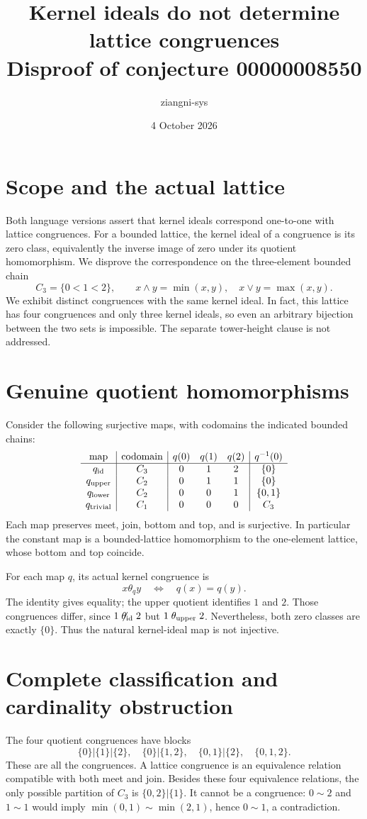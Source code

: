 \documentclass[11pt,a4paper]{article}
\title{Kernel ideals do not determine lattice congruences\\Disproof of conjecture 00000008550}
\author{ziangni-sys}
\date{4 October 2026}
\begin{document}
\maketitle
\section*{Scope and the actual lattice}
Both language versions assert that kernel ideals correspond one-to-one with lattice congruences. For a bounded lattice, the kernel ideal of a congruence is its zero class, equivalently the inverse image of zero under its quotient homomorphism. We disprove the correspondence on the three-element bounded chain
\[
 C_3=\{0<1<2\},\qquad x\wedge y=\min(x,y),\quad x\vee y=\max(x,y).
\]
We exhibit distinct congruences with the same kernel ideal. In fact, this lattice has four congruences and only three kernel ideals, so even an arbitrary bijection between the two sets is impossible. The separate tower-height clause is not addressed.

\section*{Genuine quotient homomorphisms}
Consider the following surjective maps, with codomains the indicated bounded chains:
\[
\begin{array}{c|c|ccc|c}
\text{map}&\text{codomain}&q(0)&q(1)&q(2)&q^{-1}(0)\\\hline
q_{\rm id}&C_3&0&1&2&\{0\}\\
q_{\rm upper}&C_2&0&1&1&\{0\}\\
q_{\rm lower}&C_2&0&0&1&\{0,1\}\\
q_{\rm trivial}&C_1&0&0&0&C_3
\end{array}
\]
Each map preserves meet, join, bottom and top, and is surjective. In particular the constant map is a bounded-lattice homomorphism to the one-element lattice, whose bottom and top coincide.

For each map $q$, its actual kernel congruence is
\[
 x\mathrel{\theta_q}y\quad\Longleftrightarrow\quad q(x)=q(y).
\]
The identity gives equality; the upper quotient identifies $1$ and $2$. Those congruences differ, since $1\not\mathrel{\theta_{\rm id}}2$ but $1\mathrel{\theta_{\rm upper}}2$. Nevertheless, both zero classes are exactly $\{0\}$. Thus the natural kernel-ideal map is not injective.

\newpage
\section*{Complete classification and cardinality obstruction}
The four quotient congruences have blocks
\[
 \{0\}|\{1\}|\{2\},\quad \{0\}|\{1,2\},\quad
 \{0,1\}|\{2\},\quad \{0,1,2\}.
\]
These are all the congruences. A lattice congruence is an equivalence relation compatible with both meet and join. Besides these four equivalence relations, the only possible partition of $C_3$ is $\{0,2\}|\{1\}$. It cannot be a congruence: $0\sim2$ and $1\sim1$ would imply $\min(0,1)\sim\min(2,1)$, hence $0\sim1$, a contradiction.
\end{document}
